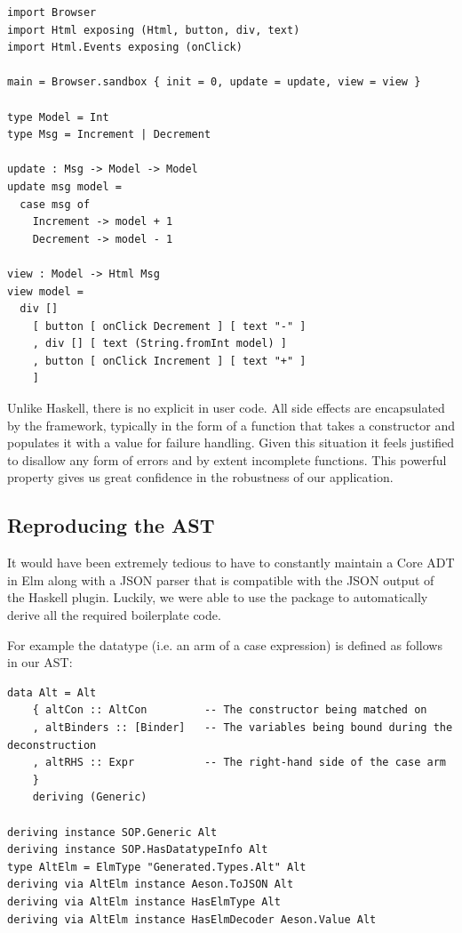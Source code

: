 \begin{listing}[H]
\begin{verbatim}
import Browser
import Html exposing (Html, button, div, text)
import Html.Events exposing (onClick)

main = Browser.sandbox { init = 0, update = update, view = view }

type Model = Int
type Msg = Increment | Decrement

update : Msg -> Model -> Model
update msg model =
  case msg of
    Increment -> model + 1
    Decrement -> model - 1

view : Model -> Html Msg
view model =
  div []
    [ button [ onClick Decrement ] [ text "-" ]
    , div [] [ text (String.fromInt model) ]
    , button [ onClick Increment ] [ text "+" ]
    ]
\end{verbatim}
\end{listing}

Unlike Haskell, there is no explicit  in user code. All side effects are encapsulated by the framework, typically in the form of a function
that takes a  constructor and populates it with a  value for failure handling.
Given this situation it feels justified to disallow any form of errors and by extent incomplete functions.
This powerful property gives us great confidence in the robustness of our application.

\subsection{Reproducing the AST}

It would have been extremely tedious to have to constantly maintain a Core ADT in Elm along with a JSON
parser that is compatible with the JSON output of the Haskell plugin. Luckily, we were able to use the
 \cite{haskell_to_elm} package to automatically derive all the required boilerplate code.

For example the  datatype (i.e. an arm of a case expression) is defined as follows in our AST:

\begin{listing}[H]
\begin{verbatim}
data Alt = Alt
    { altCon :: AltCon         -- The constructor being matched on
    , altBinders :: [Binder]   -- The variables being bound during the deconstruction
    , altRHS :: Expr           -- The right-hand side of the case arm
    }
    deriving (Generic)

deriving instance SOP.Generic Alt
deriving instance SOP.HasDatatypeInfo Alt
type AltElm = ElmType "Generated.Types.Alt" Alt
deriving via AltElm instance Aeson.ToJSON Alt
deriving via AltElm instance HasElmType Alt
deriving via AltElm instance HasElmDecoder Aeson.Value Alt
\end{verbatim}
\end{listing}

